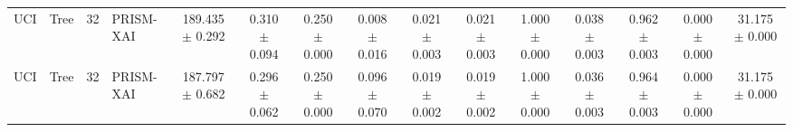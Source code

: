 \begin{table}[t]
\begin{tabular}{llllccccccccccc}
UCI & Tree & 32 & PRISM-XAI & 189.435 $\pm$ 0.292 & 0.310 $\pm$ 0.094 & 0.250 $\pm$ 0.000 & 0.008 $\pm$ 0.016 & 0.021 $\pm$ 0.003 & 0.021 $\pm$ 0.003 & 1.000 $\pm$ 0.000 & 0.038 $\pm$ 0.003 & 0.962 $\pm$ 0.003 & 0.000 $\pm$ 0.000 & 31.175 $\pm$ 0.000 \\
UCI & Tree & 32 & PRISM-XAI & 187.797 $\pm$ 0.682 & 0.296 $\pm$ 0.062 & 0.250 $\pm$ 0.000 & 0.096 $\pm$ 0.070 & 0.019 $\pm$ 0.002 & 0.019 $\pm$ 0.002 & 1.000 $\pm$ 0.000 & 0.036 $\pm$ 0.003 & 0.964 $\pm$ 0.003 & 0.000 $\pm$ 0.000 & 31.175 $\pm$ 0.000 \\
\bottomrule
\end{tabular}
\end{table}
